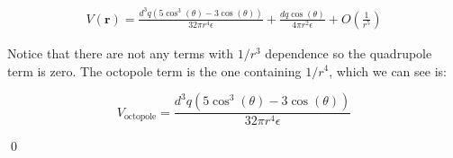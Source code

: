 \documentclass{homework}
\newcommand{\bs}[1]{\ensuremath{\boldsymbol{#1}}}
\begin{document}
\begin{homeworkProblem}[Problem 3.31]
{    \begin{align*}
      V(\bs{r}) = \frac{d^3 q \left(5 \cos ^3(\theta )-3 \cos (\theta )\right)}{32 \pi  r^4 \epsilon}+\frac{d q \cos (\theta )}{4 \pi  r^2 \epsilon } + O\left( \frac{1}{r^5} \right)
    \end{align*}

    Notice that there are not any terms with $1/r^3$ dependence so the quadrupole term is zero. The octopole term is the one containing $1/r^4$, which we can see is:

    $$V_{\text{octopole}} = \frac{d^3 q \left(5 \cos ^3(\theta )-3 \cos (\theta )\right)}{32 \pi  r^4 \epsilon}$$

    \qed



  }
\end{homeworkProblem}
\end{document}
